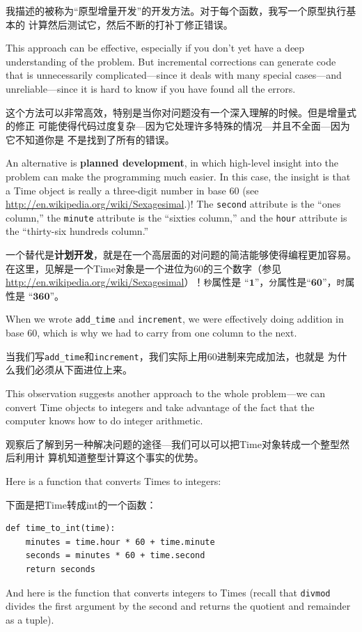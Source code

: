 \documentclass[10pt]{book}
\begin{document}
\begin{CJK}{UTF8}{gbsn}
我描述的被称为``原型增量开发''的开发方法。对于每个函数，我写一个原型执行基本的
计算然后测试它，然后不断的打补丁修正错误。

This approach can be effective, especially if you don't yet have a
deep understanding of the problem.  But incremental corrections can
generate code that is unnecessarily complicated---since it deals with
many special cases---and unreliable---since it is hard to know if you
have found all the errors.

这个方法可以非常高效，特别是当你对问题没有一个深入理解的时候。但是增量式的修正
可能使得代码过度复杂---因为它处理许多特殊的情况---并且不全面---因为它不知道你是
不是找到了所有的错误。

An alternative is {\bf planned development}, in which high-level
insight into the problem can make the programming much easier.  In
this case, the insight is that a Time object is really a three-digit
number in base 60 (see \url{http://en.wikipedia.org/wiki/Sexagesimal}.)!  The
{\tt second} attribute is the ``ones column,'' the {\tt minute}
attribute is the ``sixties column,'' and the {\tt hour} attribute is
the ``thirty-six hundreds column.''

一个替代是{\bf 计划开发}，就是在一个高层面的对问题的简洁能够使得编程更加容易。
在这里，见解是一个Time对象是一个进位为60的三个数字（参见
\url{http://en.wikipedia.org/wiki/Sexagesimal}）！{\tt 秒}属性是
``$\mathbf{1}$''，{\tt 分}属性是``$\mathbf{60}$''，{\tt 时}属性是
``$\mathbf{360}$''。

When we wrote \verb"add_time" and {\tt increment}, we were effectively
doing addition in base 60, which is why we had to carry from one
column to the next.

当我们写\verb"add_time"和{\tt increment}，我们实际上用60进制来完成加法，也就是
为什么我们必须从下面进位上来。

This observation suggests another approach to the whole problem---we
can convert Time objects to integers and take advantage of the fact
that the computer knows how to do integer arithmetic.  

观察后了解到另一种解决问题的途径---我们可以可以把Time对象转成一个整型然后利用计
算机知道整型计算这个事实的优势。

Here is a function that converts Times to integers:

下面是把Time转成int的一个函数：

\begin{verbatim}
def time_to_int(time):
    minutes = time.hour * 60 + time.minute
    seconds = minutes * 60 + time.second
    return seconds
\end{verbatim}
%
And here is the function that converts integers to Times
(recall that {\tt divmod} divides the first argument by the second
and returns the quotient and remainder as a tuple).


\end{CJK}
\end{document}
